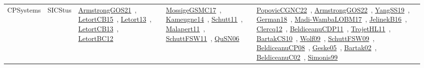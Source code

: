 {\begin{longtable}{lp{3cm}>{\raggedright\arraybackslash}p{6cm}>{\raggedright\arraybackslash}p{6cm}>{\raggedright\arraybackslash}p{8cm}}
CPSystems & SICStus & \href{../works/ArmstrongGOS21.pdf}{ArmstrongGOS21}~\cite{ArmstrongGOS21}, \href{../works/LetortCB15.pdf}{LetortCB15}~\cite{LetortCB15}, \href{../works/Letort13.pdf}{Letort13}~\cite{Letort13}, \href{../works/LetortCB13.pdf}{LetortCB13}~\cite{LetortCB13}, \href{../works/LetortBC12.pdf}{LetortBC12}~\cite{LetortBC12} & \href{../works/MossigeGSMC17.pdf}{MossigeGSMC17}~\cite{MossigeGSMC17}, \href{../works/Kameugne14.pdf}{Kameugne14}~\cite{Kameugne14}, \href{../works/Schutt11.pdf}{Schutt11}~\cite{Schutt11}, \href{../works/Malapert11.pdf}{Malapert11}~\cite{Malapert11}, \href{../works/SchuttFSW11.pdf}{SchuttFSW11}~\cite{SchuttFSW11}, \href{../works/QuSN06.pdf}{QuSN06}~\cite{QuSN06} & \href{../works/PopovicCGNC22.pdf}{PopovicCGNC22}~\cite{PopovicCGNC22}, \href{../works/ArmstrongGOS22.pdf}{ArmstrongGOS22}~\cite{ArmstrongGOS22}, \href{../works/YangSS19.pdf}{YangSS19}~\cite{YangSS19}, \href{../works/German18.pdf}{German18}~\cite{German18}, \href{../works/Madi-WambaLOBM17.pdf}{Madi-WambaLOBM17}~\cite{Madi-WambaLOBM17}, \href{../works/JelinekB16.pdf}{JelinekB16}~\cite{JelinekB16}, \href{../works/Clercq12.pdf}{Clercq12}~\cite{Clercq12}, \href{../works/BeldiceanuCDP11.pdf}{BeldiceanuCDP11}~\cite{BeldiceanuCDP11}, \href{../works/TrojetHL11.pdf}{TrojetHL11}~\cite{TrojetHL11}, \href{../works/BartakCS10.pdf}{BartakCS10}~\cite{BartakCS10}, \href{../works/Wolf09.pdf}{Wolf09}~\cite{Wolf09}, \href{../works/SchuttFSW09.pdf}{SchuttFSW09}~\cite{SchuttFSW09}, \href{../works/BeldiceanuCP08.pdf}{BeldiceanuCP08}~\cite{BeldiceanuCP08}, \href{../works/Geske05.pdf}{Geske05}~\cite{Geske05}, \href{../works/Bartak02.pdf}{Bartak02}~\cite{Bartak02}, \href{../works/BeldiceanuC02.pdf}{BeldiceanuC02}~\cite{BeldiceanuC02}, \href{../works/Simonis99.pdf}{Simonis99}~\cite{Simonis99}\\

\end{longtable}}
